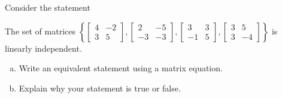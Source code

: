 
\begin{exerciseStatement}


Consider the statement 
\begin{center}\begin{minipage}{0.8\textwidth}
 The set of matrices \( \left\{ \left[\begin{array}{cc}
4 & -2 \\
3 & 5
\end{array}\right] , \left[\begin{array}{cc}
2 & -5 \\
-3 & -3
\end{array}\right] , \left[\begin{array}{cc}
3 & 3 \\
-1 & 5
\end{array}\right] , \left[\begin{array}{cc}
3 & 5 \\
3 & -4
\end{array}\right] \right\} \) is linearly independent.
\end{minipage}\end{center}
    


\begin{enumerate}[(a)]
\item  Write an equivalent statement using a matrix equation.
\item  Explain why your statement is true or false.
\end{enumerate}
    
\end{exerciseStatement}
    
